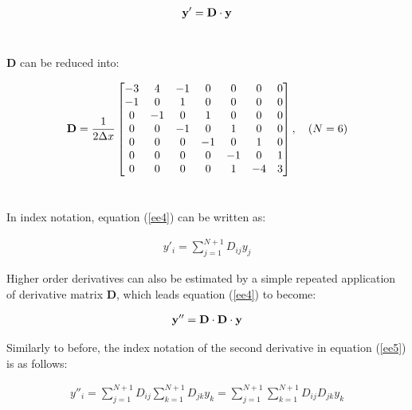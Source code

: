 \documentclass[12pt]{article}
\begin{document}
\begin{eqnarray}
{\textbf y'} = {\textbf D} \cdot {\textbf y} \label{ee4}
\end{eqnarray}
\\ 
\begin{doublespace}
\noindent
{\textbf D} can be reduced into:
\end{doublespace}

\begin{equation*}
{\textbf D} = \frac{1}{2\Delta{x}}
\begin{bmatrix} 
	-3 & 4 & -1 & 0 & 0 & 0 & 0 \\
	-1 & 0 & 1 & 0 & 0 & 0 & 0 \\
	0 & -1 & 0 & 1 & 0 & 0 & 0 \\
	0 & 0 & -1 & 0 & 1 & 0 & 0 \\
	0 & 0 & 0 & -1 & 0 & 1 & 0 \\
	0 & 0 & 0 & 0 & -1 & 0 & 1 \\
	0 & 0 & 0 & 0 & 1 & -4 & 3
\end{bmatrix}, \quad (N=6)
\end{equation*}
\\
\begin{doublespace}
\noindent
In index notation, equation (\ref{ee4}) can be written as:
\end{doublespace}

\begin{eqnarray}
y'_{i} = \sum_{j=1}^{N+1} D_{{i}{j}}y_{j}
\end{eqnarray}

\begin{doublespace}
\noindent
Higher order derivatives can also be estimated by a simple repeated application of derivative matrix {\textbf D}, which leads equation (\ref{ee4}) to become:
\end{doublespace}

\begin{eqnarray}
{\textbf y''} = {\textbf D} \cdot {\textbf D} \cdot {\textbf y} \label{ee5}
\end{eqnarray}

\begin{doublespace}
\noindent
Similarly to before, the index notation of the second derivative in equation (\ref{ee5}) is as follows:
\end{doublespace}

\begin{eqnarray}
y''_{i} = \sum_{j=1}^{N+1} D_{{i}{j}} \sum_{k=1}^{N+1} D_{{j}{k}}y_{k} = \sum_{j=1}^{N+1} \sum_{k=1}^{N+1} D_{{i}{j}} D_{{j}{k}}y_{k} \label{ee6}
\end{eqnarray}
\end{document}

